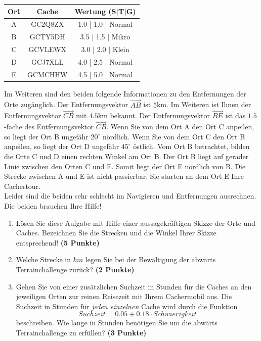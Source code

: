 \documentclass[a4paper, 9pt]{scrartcl}\usepackage[]{graphicx}\usepackage[]{xcolor}
\begin{document}
\begin{center}
  \begin{tabular}{ ccc }
    \toprule
    Ort & Cache & Wertung (S|T|G) \\
    \midrule
    A & GC2Q8ZX & 1.0 | 1.0 | Normal \\
    B & GCTY5DH & 3.5 | 1.5 | Mikro \\ 
    C & GCVLEWX & 3.0 | 2.0 | Klein \\ 
    D & GCJ7XLL & 4.0 | 2.5 | Normal \\ 
    E & GCMCHHW & 4.5 | 5.0 | Normal \\     
 \bottomrule
\end{tabular}
\end{center}

Im Weiteren sind den beiden folgende Informationen zu den Entfernungen der Orte zugänglich. Der Entfernungsvektor $\overrightarrow{AB}$ ist $5$km. Im Weiteren ist Ihnen der Entfernungsvektor $\overrightarrow{CB}$ mit $4.5$km bekannt. Der Entfernungsvektor $\overrightarrow{BE}$ ist das $1.5$-fache des Entfernungsvektor $\overrightarrow{CB}$. Wenn Sie von dem Ort A den Ort C anpeilen, so liegt der Ort B ungefähr $20^\circ$ nördlich. Wenn Sie von dem Ort C den Ort B anpeilen, so liegt der Ort D ungefähr $45^\circ$ östlich. Vom Ort B betrachtet, bilden die Orte C und D einen rechten Winkel am Ort B. Der Ort B liegt auf gerader Linie zwischen den Orten C und E. Somit liegt der Ort E nördlich von B. Die Strecke zwischen A und E ist nicht passierbar. Sie starten an dem Ort E Ihre Cachertour. \\

Leider sind die beiden sehr schlecht im Navigieren und Entfernungen ausrechnen. Die beiden brauchen Ihre Hilfe!
  
\begin{enumerate}
\item Lösen Sie diese Aufgabe mit Hilfe einer aussagekräftigen Skizze der Orte und Caches. Bezeichnen Sie die Strecken und die Winkel Ihrer Skizze entsprechend! \textbf{(5 Punkte)}
\item Welche Strecke in $km$ legen Sie bei der Bewältigung der abwärts Terrainchallenge zurück? \textbf{(2 Punkte)}
\item Gehen Sie von einer zusätzlichen Suchzeit in Stunden für die Caches an den jeweiligen Orten zur reinen Reisezeit mit Ihrem Cachermobil aus. Die Suchzeit in Stunden für \textit{jeden einzelnen} Cache wird durch die Funktion  
  \begin{equation*}
    Suchzeit = 0.05 + 0.18 \cdot Schwierigkeit
  \end{equation*}  
  beschreiben.  Wie lange in Stunden benötigen Sie um die abwärts Terrainchallenge zu erfüllen? \textbf{(3 Punkte)}
\end{enumerate}
\end{document}
